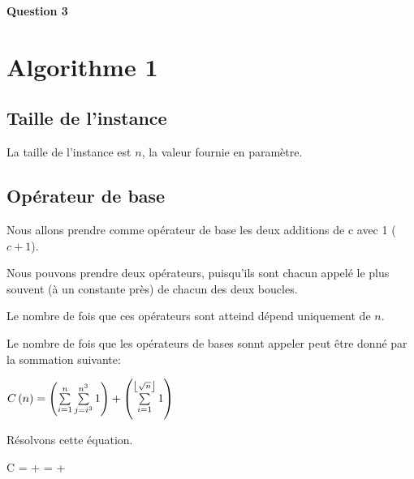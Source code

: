 \documentclass[class=article]{standalone}
\begin{document}
\centerline{\Huge \bf Question 3}
\section*{Algorithme 1}
\subsection*{Taille de l'instance}
La taille de l'instance est $n$, la valeur fournie en paramètre.

\subsection*{Opérateur de base}
Nous allons prendre comme opérateur de base les deux additions de c avec 1 ($c+1$).

Nous pouvons prendre deux opérateurs, puisqu'ils sont chacun appelé le plus souvent (à un constante près)
de chacun des deux boucles.

Le nombre de fois que ces opérateurs sont atteind dépend uniquement de $n$.

Le nombre de fois que les opérateurs de bases sonnt appeler peut être donné par la sommation suivante:

$C\left ( n \right ) = \left ( \sum\limits_{i=1}^n \sum\limits_{j=i^3}^{n^3}1 \right ) + \left ( \sum\limits_{i=1}^{\left \lfloor \sqrt{n} \right \rfloor} 1 \right )$

Résolvons cette équation.

\begin{deriv}
    C
    \<=
     + 
    \<=
     + 
\end{deriv}
\end{document}
